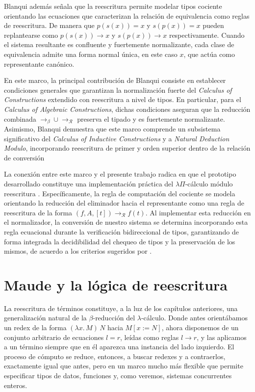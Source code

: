 Blanqui además señala que la reescritura permite modelar tipos cociente orientando las ecuaciones que caracterizan la relación de equivalencia como reglas de reescritura. De manera que $p(s(x)) = x$ y $s(p(x)) = x$ pueden replantearse como $p(s(x)) \to x$ y $s(p(x)) \to x$ respectivamente. Cuando el sistema resultante es confluente y fuertemente normalizante, cada clase de equivalencia admite una forma normal única, en este caso $x$, que actúa como representante canónico.

En este marco, la principal contribución de Blanqui consiste en establecer condiciones generales que garantizan la normalización fuerte del \textit{Calculus of Constructions} extendido con reescritura a nivel de tipos. En particular, para el \textit{Calculus of Algebraic Constructions}, dichas condiciones aseguran que la reducción combinada $\to_{\beta} \cup \to_{\mathcal{R}}$ preserva el tipado y es fuertemente normalizante. Asimismo, Blanqui demuestra que este marco comprende un subsistema significativo del \textit{Calculus of Inductive Constructions} y a \textit{Natural Deduction Modulo}, incorporando reescritura de primer y orden superior dentro de la relación de conversión

La conexión entre este marco y el presente trabajo radica en que el prototipo desarrollado constituye una implementación práctica del $\lambda\Pi$-cálculo módulo reescritura \citep{blanqui}. Específicamente, la regla de computación del cociente se modela orientando la reducción del eliminador hacia el representante como una regla de reescritura de la forma $(f, A, [t]) \to_{\mathcal{R}} f(t)$. Al implementar esta reducción en el normalizador, la conversión de nuestro sistema se determina incorporando esta regla ecuacional durante la verificación bidireccional de tipos, garantizando de forma integrada la decidibilidad del chequeo de tipos y la preservación de los mismos, de acuerdo a los criterios sugeridos por \cite{blanqui2020}.

\chapter{Maude y la lógica de reescritura}\label{ch:maude}
La reescritura de términos constituye, a la luz de los capítulos anteriores, una generalización natural de la $\beta$-reducción del $\lambda$-cálculo. Donde antes orientábamos un redex de la forma $(\lambda x.\, M)\, N$ hacia $M[x := N]$, ahora disponemos de un conjunto arbitrario de ecuaciones $l = r$, leídas como reglas $l \to r$, y las aplicamos a un término siempre que en él aparezca una instancia del lado izquierdo. El proceso de cómputo se reduce, entonces, a buscar redexes y a contraerlos, exactamente igual que antes, pero en un marco mucho más flexible que permite especificar tipos de datos, funciones y, como veremos, sistemas concurrentes enteros.

